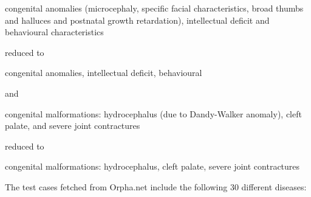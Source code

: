 congenital anomalies (microcephaly, specific facial characteristics, broad thumbs and halluces and postnatal growth retardation), intellectual deficit and behavioural characteristics

reduced to

congenital anomalies, intellectual deficit, behavioural

and 

congenital malformations: hydrocephalus (due to Dandy-Walker anomaly), cleft palate, and severe joint contractures

reduced to

congenital malformations: hydrocephalus, cleft palate, severe joint contractures

The test cases fetched from Orpha.net include the following 30 different diseases: \\


